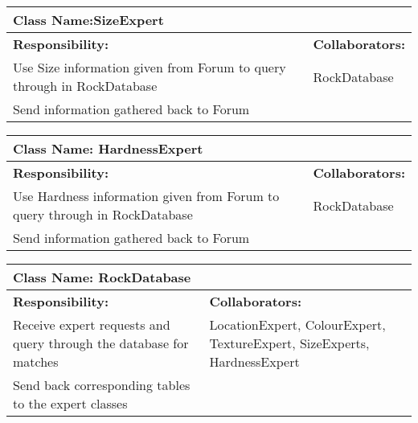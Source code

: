 \documentclass[]{article}
\begin{document}
\begin{table}[ht]
	\centering
	\begin{tabular}{|p{8cm}|p{8cm}|}
		\hline 
		\multicolumn{2}{|l|}{\textbf{Class Name:SizeExpert}} \\
		\hline
		\textbf{Responsibility:} & \textbf{Collaborators:} \\
		\hline
		Use Size information given from Forum to query through in RockDatabase & RockDatabase\\
		\hline
		Send information gathered back to Forum & \\
		\hline
	\end{tabular}
\end{table}

\begin{table}[ht]
	\centering
	\begin{tabular}{|p{8cm}|p{8cm}|}
		\hline 
		\multicolumn{2}{|l|}{\textbf{Class Name: HardnessExpert}} \\
		\hline
		\textbf{Responsibility:} & \textbf{Collaborators:} \\
		\hline
		Use Hardness information given from Forum to query through in RockDatabase & RockDatabase\\
		\hline
		Send information gathered back to Forum & \\
		\hline
	\end{tabular}
\end{table}

\begin{table}[ht]
	\centering
	\begin{tabular}{|p{8cm}|p{8cm}|}
		\hline 
		\multicolumn{2}{|l|}{\textbf{Class Name: RockDatabase}} \\
		\hline
		\textbf{Responsibility:} & \textbf{Collaborators:} \\
		\hline
		Receive expert requests and query through the database for matches & LocationExpert, ColourExpert, TextureExpert, SizeExperts, HardnessExpert\\
		\hline
		Send back corresponding tables to the expert classes & \\
		\hline
	\end{tabular}
\end{table}
\end{document}
